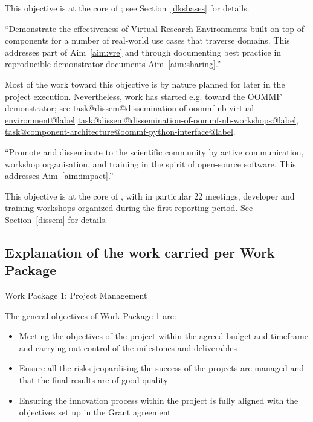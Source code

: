 \documentclass{deliverablereport}
\makeatletter
\renewcommand\subsubsection{\@startsection{subsubsection}{2}%
  \z@{.5\linespacing\@plus.7\linespacing}{.1\linespacing}%
  {\normalfont\bfseries}}
\newcommand\localtaskref[2]{\hyperref[#1@#2]{\csname task@#1@#2@label\endcsname}}
\makeatother
\begin{document}
\begin{compactenum}
  This objective is at the core of ; see
  Section~\ref{dksbases} for details. 

\item \label{objective:demo} ``Demonstrate the effectiveness of Virtual
  Research Environments built on top of \ODK components for a
  number of real-world use cases that traverse domains. This addresses
  part of Aim~\ref{aim:vre} and through documenting best practice in
  reproducible demonstrator documents Aim~\ref{aim:sharing}.''

  Most of the work toward this objective is by nature planned for
  later in the project execution. Nevertheless, work has started e.g.
  toward the OOMMF demonstrator; see
  \localtaskref{dissem}{dissemination-of-oommf-nb-virtual-environment}
  \localtaskref{dissem}{dissemination-of-oommf-nb-workshops},
  \localtaskref{component-architecture}{oommf-python-interface}.

\item \label{objective:disseminate} ``Promote and disseminate
  \ODK to the scientific community by active communication,
  workshop organisation, and training in the spirit of open-source
  software. This addresses Aim~\ref{aim:impact}.''

  This objective is at the core of , with in particular
  22 meetings, developer and training workshops organized during the
  first reporting period. See Section~\ref{dissem} for details.
\end{compactenum}

\subsection{Explanation of the work carried per Work Package}
\subsubsection{Work Package 1: Project Management}


The general objectives of Work Package 1 are:

\begin{itemize}
\item{Meeting the objectives of the project within the agreed budget and timeframe and carrying out control of the milestones and deliverables}
\item{Ensure all the risks jeopardising the success of the projects are managed and that the final results are of good quality}
\item{Ensuring the innovation process within the project is fully aligned with the objectives set up in the Grant agreement}
\end{itemize}
\end{document}
